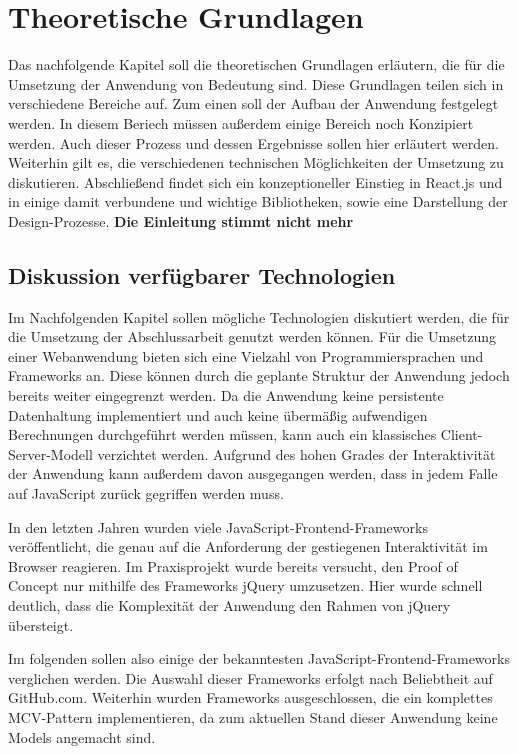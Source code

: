 \chapter{Theoretische Grundlagen}
\thispagestyle{fancy}
Das nachfolgende Kapitel soll die theoretischen Grundlagen erläutern, die für die Umsetzung der Anwendung von Bedeutung sind. Diese Grundlagen teilen sich in verschiedene Bereiche auf. Zum einen soll der Aufbau der Anwendung festgelegt werden. In diesem Beriech müssen außerdem einige Bereich noch Konzipiert werden. Auch dieser Prozess und dessen Ergebnisse sollen hier erläutert werden.
Weiterhin gilt es, die verschiedenen technischen Möglichkeiten der Umsetzung zu diskutieren. Abschließend findet sich ein konzeptioneller Einstieg in React.js und in einige damit verbundene und wichtige Bibliotheken, sowie eine Darstellung der Design-Prozesse.
\textbf{Die Einleitung stimmt nicht mehr}

\section{Diskussion verfügbarer Technologien}
Im Nachfolgenden Kapitel sollen mögliche Technologien diskutiert werden, die für die Umsetzung der Abschlussarbeit genutzt werden können. Für die Umsetzung einer Webanwendung bieten sich eine Vielzahl von Programmiersprachen und Frameworks an. Diese können durch die geplante Struktur der Anwendung jedoch bereits weiter eingegrenzt werden. Da die Anwendung keine persistente Datenhaltung implementiert und auch keine übermäßig aufwendigen Berechnungen durchgeführt werden müssen, kann auch ein klassisches Client-Server-Modell verzichtet werden.
Aufgrund des hohen Grades der Interaktivität der Anwendung kann außerdem davon ausgegangen werden, dass in jedem Falle auf JavaScript zurück gegriffen werden muss.

In den letzten Jahren wurden viele JavaScript-Frontend-Frameworks veröffentlicht, die genau auf die Anforderung der gestiegenen Interaktivität im Browser reagieren.
Im Praxisprojekt wurde bereits versucht, den Proof of Concept nur mithilfe des Frameworks jQuery umzusetzen. Hier wurde schnell deutlich, dass die Komplexität der Anwendung den Rahmen von jQuery übersteigt.

Im folgenden sollen also einige der bekanntesten JavaScript-Frontend-Frameworks verglichen werden. Die Auswahl dieser Frameworks erfolgt nach Beliebtheit auf GitHub.com. Weiterhin wurden Frameworks ausgeschlossen, die ein komplettes MCV-Pattern implementieren, da zum aktuellen Stand dieser Anwendung keine Models angemacht sind.

